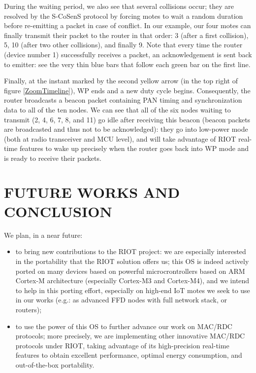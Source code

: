\documentclass[a4paper,twoside]{article}
\begin{document}
During the waiting period, we also see that several collisions occur; they
are resolved by the S-CoSenS protocol by forcing motes to wait a random
duration before re-emitting a packet in case of conflict. In our example,
our four motes can finally transmit their packet to the router in that
order: \textsf{3} (after a first collision), \textsf{5}, \textsf{10} (after
two other collisions), and finally \textsf{9}. Note that every time the
router (device number \textsf{1}) successfully receives a packet, an
acknowledgement is sent back to emitter: see the very thin blue bars that
follow each green bar on the first line.

Finally, at the instant marked by the second yellow arrow (in the top right
of figure \ref{ZoomTimeline}), WP ends and a new duty cycle begins.
Consequently, the router broadcasts a beacon packet containing PAN timing and
synchronization data to all of the ten nodes. We can see that all of the
six nodes waiting to transmit (\textsf{2}, \textsf{4}, \textsf{6}, \textsf{7},
\textsf{8}, and \textsf{11}) go idle after receiving this beacon (beacon
packets are broadcasted and thus not to be acknowledged): they go
into low-power mode (both at radio transceiver and MCU level), and will
take advantage of RIOT real-time features to wake up precisely when
the router goes back into WP mode and is ready to receive their
packets.



\section{\uppercase{Future Works and Conclusion}}

We plan, in a near future:

\begin{itemize}

\item to bring new contributions to the RIOT project: we are especially
      interested in the portability that the RIOT solution offers us;
      this OS is indeed actively ported on many devices based on powerful
      microcrontrollers based on ARM Cortex-M architecture (especially
      Cortex-M3 and Cortex-M4), and we intend to help in this porting
      effort, especially on high-end IoT motes we seek to use in our
      works (e.g.: as advanced FFD nodes with full network stack,
      or routers);

\item to use the power of this OS to further advance our work on MAC/RDC
      protocols; more precisely, we are implementing other innovative
      MAC/RDC protocols under RIOT, taking advantage of its high-precision
      real-time features to obtain excellent performance, optimal energy
      consumption, and out-of-the-box portability.

\end{itemize}
\end{document}
